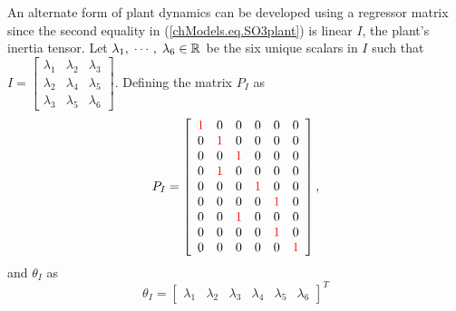An alternate form of plant dynamics can be developed using a regressor
matrix since the second equality in (\ref{chModels.eq.SO3plant}) is
linear $I$, the plant's inertia tensor.
%
Let
$\lambda_1,\;\cdots,\;\lambda_6\in\mathbb{R}^{}$
be the six unique scalars in $I$ such that 
%
{\ssp
$I=\left[\begin{array}{ccc}
\lambda_1 & \lambda_2 & \lambda_3 \\
\lambda_2 & \lambda_4 & \lambda_5 \\
\lambda_3 & \lambda_5 & \lambda_6 
\end{array}\right]$.} 
%
Defining the matrix $P_I$ as
%
\begin{equation}
\ssp
  P_I=\left[ \begin{array}{cccccc}
      {\color{red}1} & 0 & 0 & 0 & 0 & 0 \\
      0 & {\color{red}1} & 0 & 0 & 0 & 0 \\
      0 & 0 & {\color{red}1} & 0 & 0 & 0 \\
      0 & {\color{red}1} & 0 & 0 & 0 & 0 \\
      0 & 0 & 0 & {\color{red}1} & 0 & 0 \\
      0 & 0 & 0 & 0 & {\color{red}1} & 0 \\
      0 & 0 & {\color{red}1} & 0 & 0 & 0 \\
      0 & 0 & 0 & 0 & {\color{red}1} & 0 \\
      0 & 0 & 0 & 0 & 0 & {\color{red}1} \\
    \end{array}\right],
\end{equation}
%
and $\theta_I$ as
\begin{equation}
\theta_I=\left[\begin{array}{cccccc}
\lambda_1 &
\lambda_2 &
\lambda_3 &
\lambda_4 &
\lambda_5 &
\lambda_6 
\end{array}\right]^T
\end{equation}   
%
